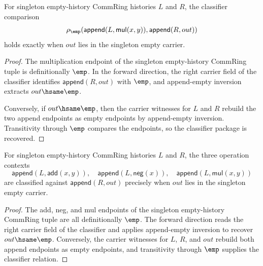\begin{theorem}
\label{thm:commring-singleton-empty-classifier-mul-context-carrier-iff}
For singleton empty-history CommRing histories $L$ and $R$, the classifier
comparison
$$
\rho_{\emp}(\mathsf{append}(L,\mathsf{mul}(x,y)),\mathsf{append}(R,out))
$$
holds exactly when $out$ lies in the singleton empty carrier.
\end{theorem}
\begin{proof}
The multiplication endpoint of the singleton empty-history CommRing tuple is
definitionally $\emp$. In the forward direction, the right carrier field of
the classifier identifies $\mathsf{append}(R,out)$ with $\emp$, and
append-empty inversion extracts $out\hsame\emp$.

Conversely, if $out\hsame\emp$, then the carrier witnesses for $L$ and $R$
rebuild the two append endpoints as empty endpoints by append-empty
inversion. Transitivity through $\emp$ compares the endpoints, so the
classifier package is recovered.
\end{proof}

\begin{theorem}
\label{thm:commring-singleton-empty-classifier-operation-context-carrier-package}
For singleton empty-history CommRing histories $L$ and $R$, the three operation
contexts
$$
\mathsf{append}(L,\mathsf{add}(x,y)),\quad
\mathsf{append}(L,\mathsf{neg}(x)),\quad
\mathsf{append}(L,\mathsf{mul}(x,y))
$$
are classified against $\mathsf{append}(R,out)$ precisely when $out$ lies in
the singleton empty carrier.
\end{theorem}
\begin{proof}
The add, neg, and mul endpoints of the singleton empty-history CommRing tuple
are all definitionally $\emp$. The forward direction reads the right carrier
field of the classifier and applies append-empty inversion to recover
$out\hsame\emp$. Conversely, the carrier witnesses for $L$, $R$, and $out$
rebuild both append endpoints as empty endpoints, and transitivity through
$\emp$ supplies the classifier relation.
\end{proof}

